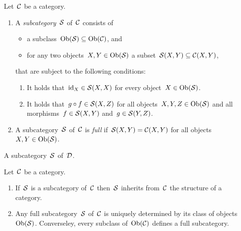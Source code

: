 \begin{definition*}
  Let~$\mathcal{C}$ be a category.
  \begin{enumerate}
    \item 
      A \emph{subcategory}~$\mathcal{S}$ of~$\mathcal{C}$ consists of
      \begin{itemize}
        \item
          a subclass~$\operatorname{Ob}(\mathcal{S}) \subseteq \operatorname{Ob}(\mathcal{C})$, and
        \item
          for any two objects~$X, Y \in \operatorname{Ob}(\mathcal{S})$ a subset~$\mathcal{S}(X,Y) \subseteq \mathcal{C}(X,Y)$,
      \end{itemize}
      that are subject to the following conditions:
      \begin{enumerate}[label=(S\arabic*)]
        \item
          It holds that~$\operatorname{id}_X \in \mathcal{S}(X,X)$ for every object~$X \in \operatorname{Ob}(\mathcal{S})$.
        \item
          It holds that~$g \circ f \in \mathcal{S}(X,Z)$ for all objects~$X, Y, Z \in \operatorname{Ob}(\mathcal{S})$ and all morphisms~$f \in \mathcal{S}(X,Y)$ and~$g \in \mathcal{S}(Y,Z)$.
      \end{enumerate}
    \item
      A subcategory~$\mathcal{S}$ of~$\mathcal{C}$ is \emph{full} if~$\mathcal{S}(X,Y) = \mathcal{C}(X,Y)$ for all objects~$X, Y \in \operatorname{Ob}(\mathcal{S})$.
  \end{enumerate}
  A subcategory~$\mathcal{S}$ of~$\mathcal{D}$.
\end{definition*}


\begin{remark*}
  Let~$\mathcal{C}$ be a category.
  \begin{enumerate}
    \item
      If~$\mathcal{S}$ is a subcategory of~$\mathcal{C}$ then~$\mathcal{S}$ inherits from~$\mathcal{C}$ the structure of a category.
    \item
      Any full subcategory~$\mathcal{S}$ of~$\mathcal{C}$ is uniquely determined by its class of objects~$\operatorname{Ob}(\mathcal{S})$.
      Converseley, every subclass of~$\operatorname{Ob}(\mathcal{C})$ defines a full subcategory.
  \end{enumerate}
\end{remark*}





